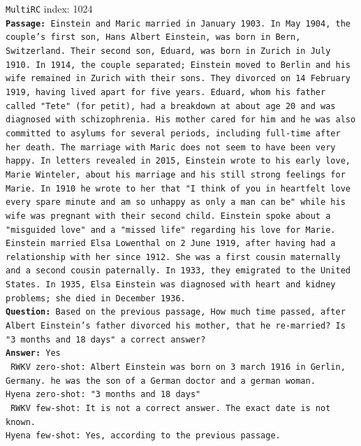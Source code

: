 \begin{tcolorbox}
    {\tt MultiRC} index: 1024 \\ 
    
    \small {\tt \textbf{Passage:} Einstein and Maric married in January 1903. In May 1904, the couple's first son, Hans Albert Einstein, was born in Bern, Switzerland. Their second son, Eduard, was born in Zurich in July 1910. In 1914, the couple separated; Einstein moved to Berlin and his wife remained in Zurich with their sons. They divorced on 14 February 1919, having lived apart for five years. Eduard, whom his father called "Tete" (for petit), had a breakdown at about age 20 and was diagnosed with schizophrenia. His mother cared for him and he was also committed to asylums for several periods, including full-time after her death. The marriage with Maric does not seem to have been very happy. In letters revealed in 2015, Einstein wrote to his early love, Marie Winteler, about his marriage and his still strong feelings for Marie. In 1910 he wrote to her that "I think of you in heartfelt love every spare minute and am so unhappy as only a man can be" while his wife was pregnant with their second child. Einstein spoke about a "misguided love" and a "missed life" regarding his love for Marie. Einstein married Elsa Lowenthal on 2 June 1919, after having had a relationship with her since 1912. She was a first cousin maternally and a second cousin paternally. In 1933, they emigrated to the United States. In 1935, Elsa Einstein was diagnosed with heart and kidney problems; she died in December 1936.} \\ 
    
    {\tt \textbf{Question:} Based on the previous passage, How much time passed, after Albert Einstein's father divorced his mother, that he re-married? Is "3 months and 18 days" a correct answer?} \\

    {\tt \textbf{Answer:} Yes} \\ 

    {\tt {\color{red!80} RWKV zero-shot}: Albert Einstein was born on 3 march 1916 in Gerlin, Germany. he was the son of a German doctor and a german woman.}  \\ 

    {\tt {\color{blue!80}Hyena zero-shot}: "3 months and 18 days"}  \\

    {\tt {\color{red!80} RWKV few-shot}: It is not a correct answer. The exact date is not known.} \\

    {\tt {\color{blue!80}Hyena few-shot}: Yes, according to the previous passage.} 
\end{tcolorbox}

